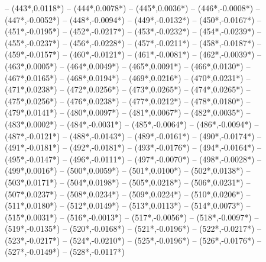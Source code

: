 {		-- ({443*\dx},{0.0118*\dy})
		-- ({444*\dx},{0.0078*\dy})
		-- ({445*\dx},{0.0036*\dy})
		-- ({446*\dx},{-0.0008*\dy})
		-- ({447*\dx},{-0.0052*\dy})
		-- ({448*\dx},{-0.0094*\dy})
		-- ({449*\dx},{-0.0132*\dy})
		-- ({450*\dx},{-0.0167*\dy})
		-- ({451*\dx},{-0.0195*\dy})
		-- ({452*\dx},{-0.0217*\dy})
		-- ({453*\dx},{-0.0232*\dy})
		-- ({454*\dx},{-0.0239*\dy})
		-- ({455*\dx},{-0.0237*\dy})
		-- ({456*\dx},{-0.0228*\dy})
		-- ({457*\dx},{-0.0211*\dy})
		-- ({458*\dx},{-0.0187*\dy})
		-- ({459*\dx},{-0.0157*\dy})
		-- ({460*\dx},{-0.0121*\dy})
		-- ({461*\dx},{-0.0081*\dy})
		-- ({462*\dx},{-0.0039*\dy})
		-- ({463*\dx},{0.0005*\dy})
		-- ({464*\dx},{0.0049*\dy})
		-- ({465*\dx},{0.0091*\dy})
		-- ({466*\dx},{0.0130*\dy})
		-- ({467*\dx},{0.0165*\dy})
		-- ({468*\dx},{0.0194*\dy})
		-- ({469*\dx},{0.0216*\dy})
		-- ({470*\dx},{0.0231*\dy})
		-- ({471*\dx},{0.0238*\dy})
		-- ({472*\dx},{0.0256*\dy})
		-- ({473*\dx},{0.0265*\dy})
		-- ({474*\dx},{0.0265*\dy})
		-- ({475*\dx},{0.0256*\dy})
		-- ({476*\dx},{0.0238*\dy})
		-- ({477*\dx},{0.0212*\dy})
		-- ({478*\dx},{0.0180*\dy})
		-- ({479*\dx},{0.0141*\dy})
		-- ({480*\dx},{0.0097*\dy})
		-- ({481*\dx},{0.0067*\dy})
		-- ({482*\dx},{0.0035*\dy})
		-- ({483*\dx},{0.0002*\dy})
		-- ({484*\dx},{-0.0031*\dy})
		-- ({485*\dx},{-0.0064*\dy})
		-- ({486*\dx},{-0.0094*\dy})
		-- ({487*\dx},{-0.0121*\dy})
		-- ({488*\dx},{-0.0143*\dy})
		-- ({489*\dx},{-0.0161*\dy})
		-- ({490*\dx},{-0.0174*\dy})
		-- ({491*\dx},{-0.0181*\dy})
		-- ({492*\dx},{-0.0181*\dy})
		-- ({493*\dx},{-0.0176*\dy})
		-- ({494*\dx},{-0.0164*\dy})
		-- ({495*\dx},{-0.0147*\dy})
		-- ({496*\dx},{-0.0111*\dy})
		-- ({497*\dx},{-0.0070*\dy})
		-- ({498*\dx},{-0.0028*\dy})
		-- ({499*\dx},{0.0016*\dy})
		-- ({500*\dx},{0.0059*\dy})
		-- ({501*\dx},{0.0100*\dy})
		-- ({502*\dx},{0.0138*\dy})
		-- ({503*\dx},{0.0171*\dy})
		-- ({504*\dx},{0.0198*\dy})
		-- ({505*\dx},{0.0218*\dy})
		-- ({506*\dx},{0.0231*\dy})
		-- ({507*\dx},{0.0237*\dy})
		-- ({508*\dx},{0.0234*\dy})
		-- ({509*\dx},{0.0224*\dy})
		-- ({510*\dx},{0.0206*\dy})
		-- ({511*\dx},{0.0180*\dy})
		-- ({512*\dx},{0.0149*\dy})
		-- ({513*\dx},{0.0113*\dy})
		-- ({514*\dx},{0.0073*\dy})
		-- ({515*\dx},{0.0031*\dy})
		-- ({516*\dx},{-0.0013*\dy})
		-- ({517*\dx},{-0.0056*\dy})
		-- ({518*\dx},{-0.0097*\dy})
		-- ({519*\dx},{-0.0135*\dy})
		-- ({520*\dx},{-0.0168*\dy})
		-- ({521*\dx},{-0.0196*\dy})
		-- ({522*\dx},{-0.0217*\dy})
		-- ({523*\dx},{-0.0217*\dy})
		-- ({524*\dx},{-0.0210*\dy})
		-- ({525*\dx},{-0.0196*\dy})
		-- ({526*\dx},{-0.0176*\dy})
		-- ({527*\dx},{-0.0149*\dy})
		-- ({528*\dx},{-0.0117*\dy})
}
